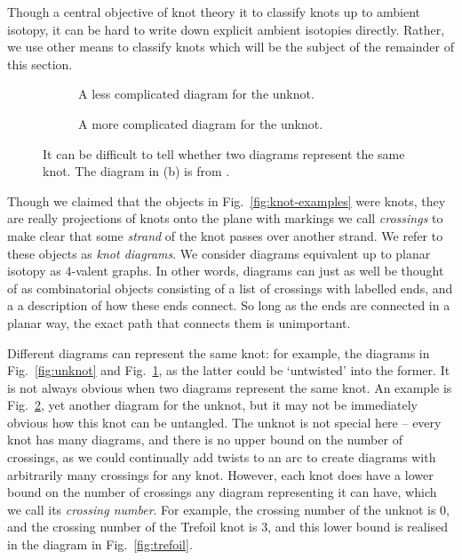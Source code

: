 \documentclass[12pt]{report}
\begin{document}
Though a central objective of knot theory it to classify knots up to ambient isotopy, it can be hard to write down explicit ambient isotopies directly. Rather, we use other means to classify knots which will be the subject of the remainder of this section.

\begin{figure}[hbt]
	\centering
	\hspace*{\fill}
	\begin{subfigure}[b]{0.35 \textwidth}
		\centering
		\def\svgscale{0.2}
		
		\caption{A less complicated diagram for the unknot.}
		\label{fig:unknot-twisted}
	\end{subfigure}
	\hspace*{\fill}
	\begin{subfigure}[b]{0.35 \textwidth}
		\centering
		\def\svgscale{0.2}
		
		\caption{A more complicated diagram for the unknot.}
		\label{fig:unknot-goertiz}
	\end{subfigure}
	\hspace*{\fill}
	\caption{It can be difficult to tell whether two diagrams represent the same knot. The diagram in (b) is from \cite{notes-on-knot-theory}.}
	\label{fig:more-unknots}
\end{figure}

Though we claimed that the objects in Fig.~\ref{fig:knot-examples} were knots, they are really projections of knots onto the plane with markings we call \textit{crossings} to make clear that some \textit{strand} of the knot passes over another strand. We refer to these objects as \textit{knot diagrams}. We consider diagrams equivalent up to planar isotopy as $4$-valent graphs. In other words, diagrams can just as well be thought of as combinatorial objects consisting of a list of crossings with labelled ends, and a a description of how these ends connect. So long as the ends are connected in a planar way, the exact path that connects them is unimportant.

Different diagrams can represent the same knot: for example, the diagrams in Fig.~\ref{fig:unknot} and Fig.~\ref{fig:unknot-twisted}, as the latter could be `untwisted' into the former. It is not always obvious when two diagrams represent the same knot. An example is Fig.~\ref{fig:unknot-goertiz}, yet another diagram for the unknot, but it may not be immediately obvious how this knot can be untangled. The unknot is not special here -- every knot has many diagrams, and there is no upper bound on the number of crossings, as we could continually add twists to an arc to create diagrams with arbitrarily many crossings for any knot. However, each knot does have a lower bound on the number of crossings any diagram representing it can have, which we call its \textit{crossing number}. For example, the crossing number of the unknot is $0$, and the crossing number of the Trefoil knot is $3$, and this lower bound is realised in the diagram in Fig.~\ref{fig:trefoil}.
\end{document}

